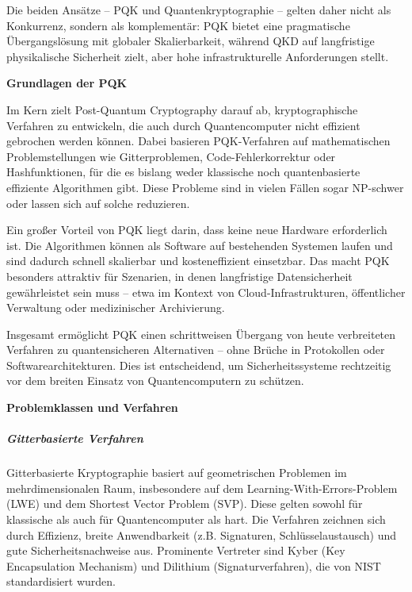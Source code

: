 \noindent
Die beiden Ansätze – PQK und Quantenkryptographie – gelten daher nicht als Konkurrenz, sondern als komplementär: PQK bietet eine pragmatische Übergangslösung mit globaler Skalierbarkeit, während QKD auf langfristige physikalische Sicherheit zielt, aber hohe  infrastrukturelle Anforderungen stellt. \cite{mosca_et_al_cybersecurity_2018}


\vspace{1em}
\noindent\textbf{Grundlagen der PQK}

\noindent
Im Kern zielt Post-Quantum Cryptography darauf ab, kryptographische Verfahren zu entwickeln, die auch durch Quantencomputer nicht effizient gebrochen werden können. Dabei basieren PQK-Verfahren auf mathematischen Problemstellungen wie Gitterproblemen, Code-Fehlerkorrektur oder Hashfunktionen, für die es bislang weder klassische noch quantenbasierte effiziente Algorithmen gibt. Diese Probleme sind in vielen Fällen sogar NP-schwer oder lassen sich auf solche reduzieren. \cite{chen_l_et_al_report_2016, bernstein_et_al_post-quantum_2009}

\noindent
Ein großer Vorteil von PQK liegt darin, dass keine neue Hardware erforderlich ist. Die Algorithmen können als Software auf bestehenden Systemen laufen und sind dadurch schnell skalierbar und kosteneffizient einsetzbar. Das macht PQK besonders attraktiv für Szenarien, in denen langfristige Datensicherheit gewährleistet sein muss – etwa im Kontext von Cloud-Infrastrukturen, öffentlicher Verwaltung oder medizinischer Archivierung. \cite{mosca_et_al_cybersecurity_2018, national_academies_of_sciences_quantum_2019}

\noindent
Insgesamt ermöglicht PQK einen schrittweisen Übergang von heute verbreiteten Verfahren zu quantensicheren Alternativen – ohne Brüche in Protokollen oder Softwarearchitekturen. Dies ist entscheidend, um Sicherheitssysteme rechtzeitig vor dem breiten Einsatz von Quantencomputern zu schützen. \cite{chen_l_et_al_report_2016, bernstein_et_al_post-quantum_2009}

\vspace{1em}
\noindent\textbf{Problemklassen und Verfahren}
\subparagraph{Gitterbasierte Verfahren}
Gitterbasierte Kryptographie basiert auf geometrischen Problemen im mehrdimensionalen Raum, insbesondere auf dem Learning-With-Errors-Problem (LWE) und dem Shortest Vector Problem (SVP). Diese gelten sowohl für klassische als auch für Quantencomputer als hart. Die Verfahren zeichnen sich durch Effizienz, breite Anwendbarkeit (z.B. Signaturen, Schlüsselaustausch) und gute Sicherheitsnachweise aus. Prominente Vertreter sind Kyber (Key Encapsulation Mechanism) und Dilithium (Signaturverfahren), die von NIST standardisiert wurden. \cite{regev_o_lattices_2005, alagic_g_et_al_status_2023, nist_fips_2024}
 
